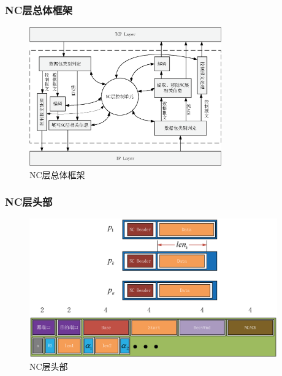 \begin{frame}[t]
	\frametitle{NC层总体框架}
	\begin{figure}
		\includegraphics[height=6cm]{../figures/jiagou.eps}
		\caption{NC层总体框架}
		\label{fig:jiagou}
	\end{figure}
\end{frame}
\begin{frame}
	\frametitle{NC层头部}
	\begin{figure}
		\includegraphics[height=6cm]{../figures/codingheader.eps}
		\caption{NC层头部}
		\label{fig:codingheader}
	\end{figure}
	\note{
	}
\end{frame}
